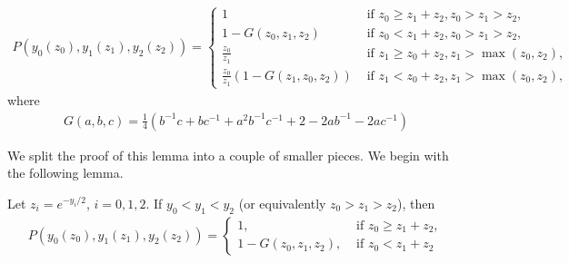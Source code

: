 \begin{lemma}\label{lem:triangle_prob_y_coordinates}
\begin{align*}
P(y_0(z_0),y_1(z_1),y_2(z_2)) = \begin{cases}
	1 &\text{ if } z_0 \geq z_1+z_2, z_0 > z_1 > z_2, \\
	1-G(z_0,z_1,z_2) &\text{ if } z_0 < z_1+z_2, z_0 > z_1 > z_2, \\
	\frac{z_0}{z_1} &\text{ if } z_1 \geq z_0+z_2, z_1 > \max(z_0,z_2), \\
	\frac{z_0}{z_1}\left(1-G(z_1,z_0,z_2)\right) &\text{ if } z_1 < z_0+z_2, z_1 > \max(z_0,z_2),
\end{cases}
\end{align*}
where 
\begin{align*}
G(a,b,c) = \frac{1}{4}
\left( b^{-1}c + bc^{-1} + a^2b^{-1}c^{-1} + 2 - 2ab^{-1}-2ac^{-1}\right)
\end{align*}
\end{lemma}



We split the proof of this lemma into a couple of smaller pieces. We begin with the following lemma.

\begin{lemma}\label{lem:ordered}
Let $z_i = e^{-y_i/2}$, $i=0,1,2$. If $y_0<y_1<y_2$ (or equivalently $z_0 > z_1 > z_2$), then
\begin{align*}
P(y_0(z_0),y_1(z_1),y_2(z_2)) = \begin{cases}
1, &\text{ if } z_0 \geq z_1+z_2,  \\
1-G(z_0,z_1,z_2), &\text{ if } z_0 < z_1+z_2
\end{cases}
\end{align*}
\end{lemma}

